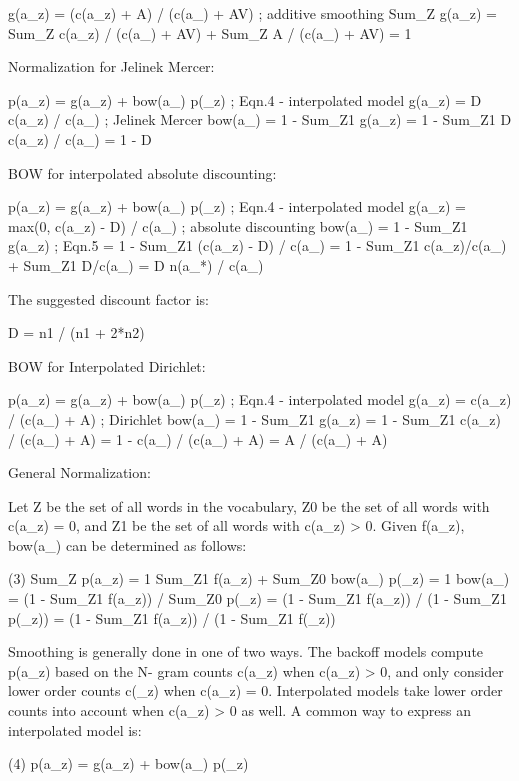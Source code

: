    g(a_z)  = (c(a_z) + A) / (c(a_) + AV)  ; additive smoothing
   Sum_Z g(a_z) = Sum_Z c(a_z) / (c(a_) + AV) + Sum_Z A / (c(a_) + AV)
                = 1


Normalization for Jelinek Mercer:

   p(a_z)  = g(a_z) + bow(a_) p(_z)   ; Eqn.4 - interpolated model
   g(a_z)  = D c(a_z) / c(a_)         ; Jelinek Mercer
   bow(a_) = 1 - Sum_Z1 g(a_z)
           = 1 - Sum_Z1 D c(a_z) / c(a_)
           = 1 - D


BOW for interpolated absolute discounting:

   p(a_z)  = g(a_z) + bow(a_) p(_z)   ; Eqn.4 - interpolated model
   g(a_z)  = max(0, c(a_z) - D) / c(a_) ; absolute discounting
   bow(a_) = 1 - Sum_Z1 g(a_z)        ; Eqn.5
           = 1 - Sum_Z1 (c(a_z) - D) / c(a_)
           = 1 - Sum_Z1 c(a_z)/c(a_) + Sum_Z1 D/c(a_)
           = D n(a_*) / c(a_)

              The suggested discount factor is:

                   D = n1 / (n1 + 2*n2)

BOW for Interpolated Dirichlet:

   p(a_z)  = g(a_z) + bow(a_) p(_z)   ; Eqn.4 - interpolated model
   g(a_z)  = c(a_z) / (c(a_) + A)         ; Dirichlet
   bow(a_) = 1 - Sum_Z1 g(a_z)
           = 1 - Sum_Z1 c(a_z) / (c(a_) + A)
           = 1 - c(a_) / (c(a_) + A)
           = A / (c(a_) + A)


       General Normalization:

       Let Z be the set of all words in the vocabulary, Z0 be the set of all words with c(a_z) = 0,  and  Z1
       be the set of all words with c(a_z) > 0.  Given f(a_z), bow(a_) can be determined as follows:

       (3)  Sum_Z  p(a_z) = 1
            Sum_Z1 f(a_z) + Sum_Z0 bow(a_) p(_z) = 1
            bow(a_) = (1 - Sum_Z1 f(a_z)) / Sum_Z0 p(_z)
                    = (1 - Sum_Z1 f(a_z)) / (1 - Sum_Z1 p(_z))
                    = (1 - Sum_Z1 f(a_z)) / (1 - Sum_Z1 f(_z))

       Smoothing  is  generally  done in one of two ways.  The backoff models compute p(a_z) based on the N-
       gram counts c(a_z) when c(a_z) > 0, and only consider lower order  counts  c(_z)  when  c(a_z)  =  0.
       Interpolated  models  take  lower order counts into account when c(a_z) > 0 as well.  A common way to
       express an interpolated model is:

       (4)  p(a_z) = g(a_z) + bow(a_) p(_z)

